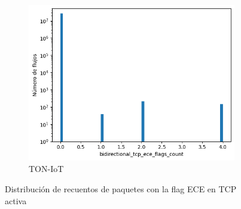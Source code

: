 \begin{figure}[H]
    \begin{subfigure}[b]{0.32\textwidth}
        \centering
        \includegraphics[width=\linewidth]{media/packet_pincer_toniot/bidirectional_tcp_ece_flags_count_linear_x_log_y.png}
        \caption{TON-IoT}
    \end{subfigure}
       \caption{Distribución de recuentos de paquetes con la flag ECE en TCP activa}
       \label{fig:packet_pincer_bidirectional_tcp_ece_flags_count}
\end{figure}

